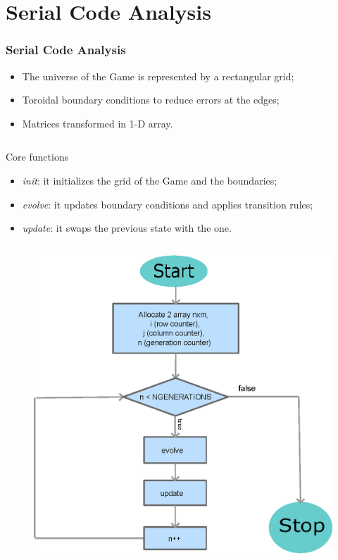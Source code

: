 \documentclass{beamer}
\begin{document}
\section{Serial Code Analysis}
\begin{frame}
	\frametitle{Serial Code Analysis}
	\begin{minipage}{0.6\textwidth}
		\begin{itemize}
			\item The universe of the Game is represented by a rectangular grid;
			\item Toroidal boundary conditions to reduce errors at the edges;
			\item Matrices transformed in 1-D array.
		\end{itemize}
		\begin{columns}
			\begin{block}{Core functions}
				\begin{itemize}
					\item \textit{init}: it initializes the grid of the Game and the boundaries;\\
					\item \textit{evolve}: it updates boundary conditions and applies transition rules;\\
					\item \textit{update}: it swaps the previous state with the one.
				\end{itemize}
			\end{block}
		\end{columns}
	\end{minipage}%
	\begin{minipage}{0.4\textwidth}
		\begin{figure}
			\centering
			\includegraphics[width=\linewidth]{../report/chart.eps}
		\end{figure}
	\end{minipage}
\end{frame}
\end{document}
